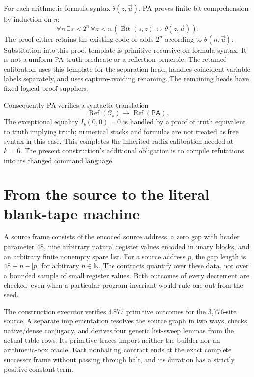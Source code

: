 \documentclass[10pt,letterpaper]{article}
\newcommand{\PA}{\mathsf{PA}}
\newcommand{\Refut}{\operatorname{Ref}}
\begin{document}
For each arithmetic formula syntax $\theta(z,\vec u)$, PA proves finite
bit comprehension by induction on $n$:
\[
 \forall n\,\exists s<2^n\,\forall z<n\,
       (\operatorname{Bit}(s,z)\leftrightarrow\theta(z,\vec u)).
\]
The proof either retains the existing code or adds $2^n$ according to
$\theta(n,\vec u)$. Substitution into this proof template is primitive
recursive on formula syntax. It is not a uniform PA truth predicate or
a reflection principle. The retained calibration uses this template for
the separation head, handles coincident variable labels separately, and
uses capture-avoiding renaming. The remaining heads have fixed logical
proof suppliers.

Consequently PA verifies a syntactic translation
\[
             \Refut(\mathcal C_k)\longrightarrow\Refut(\PA).
\]
The exceptional equality $I_k(0,0)=0$ is handled by a proof of truth
equivalent to truth implying truth; numerical stacks and formulas are not
treated as free syntax in this case. This completes the inherited radix
calibration needed at $k=6$\cite{radix}. The present construction's additional
obligation is to compile refutations into its changed command language.



\section{From the source to the literal blank-tape machine}
\label{sec:physical}

A source frame consists of the encoded source address, a zero gap with
header parameter 48, nine arbitrary natural register values encoded in
unary blocks, and an arbitrary finite nonempty spare list. For a source
address $p$, the gap length is $48+n-|p|$ for arbitrary $n\in\mathbb N$.
The contracts quantify over these data, not over a bounded sample of small
register values. Both outcomes of every decrement are checked, even when
a particular program invariant would rule one out from the seed.

The construction executor verifies 4,877 primitive outcomes for the
3,776-site source. A separate implementation resolves the source graph in
two ways, checks native/dense conjugacy, and derives four generic list-sweep
lemmas from the actual table rows. Its primitive traces import neither the
builder nor an arithmetic-box oracle. Each nonhalting contract ends at
the exact complete successor frame without passing through halt, and its
duration has a strictly positive constant term.
\end{document}

